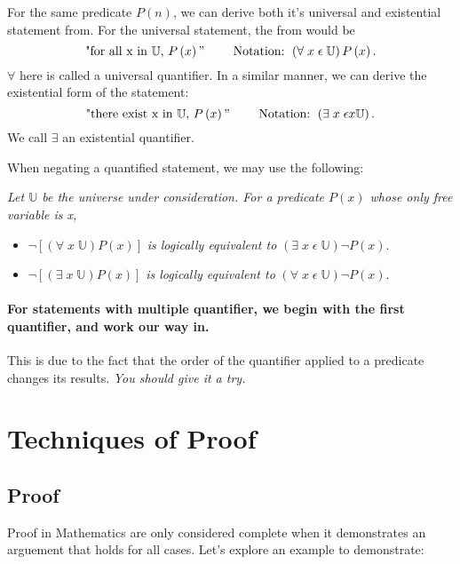\documentclass[a4paper]{article}
\begin{document}
For the same predicate  $P\left( n \right) $, we can derive both it's universal and existential statement from. For the universal statement, the from would be \[
	\text{"for all x in $\mathbb{U}$, $P\left( x \right) "$ } \qquad \text{Notation: }\left( \forall \; x \;\epsilon \; \mathbb{U} \right) P \left(x \right) 
.\]
\noindent $\forall$ here is called a universal quantifier.
In a similar manner, we can derive the existential form of the statement: \[
	\text{"there exist x in  $\mathbb {U}$,  $P\left( x \right)"$ } \qquad \text{Notation: } \left( \exists \; x \; \epsilon x \mathbb{U} \right) 
.\]
We call $\mathbb{\exists}$ an existential quantifier.
\vspace{15pt}

\noindent When negating a quantified statement, we may use the following:

\begin{tcolorbox}
	\textit{Let $\mathbb{U}$ be the universe under consideration. For a predicate  $P\left( x \right) $ whose only free variable is x,}
	\begin{itemize}
		\item[] $\neg [\left( \forall \; x \; \mathbb{U} \right) P\left( x \right) ]$ \textit{is logically equivalent to } $\left( \exists \; x \; \epsilon \; \mathbb{U} \right) \neg P \left( x \right) .$ 
		\item[] $\neg [\left( \exists \; x \; \mathbb{U} \right) P\left( x \right) ]$ \textit{is logically equivalent to } $\left( \forall \; x \; \epsilon \; \mathbb{U} \right) \neg P \left( x \right) .$ 
	\end{itemize}
\end{tcolorbox}

\paragraph{For statements with multiple quantifier, we begin with the first quantifier, and work our way in.} This is due to the fact that the order of the quantifier applied to a predicate changes its results. \textit{You should give it a try.}
\section{Techniques of Proof}
\subsection{Proof}
Proof in Mathematics are only considered complete when it demonstrates an arguement that holds for all cases. Let's explore an example to demonstrate:
\end{document}
